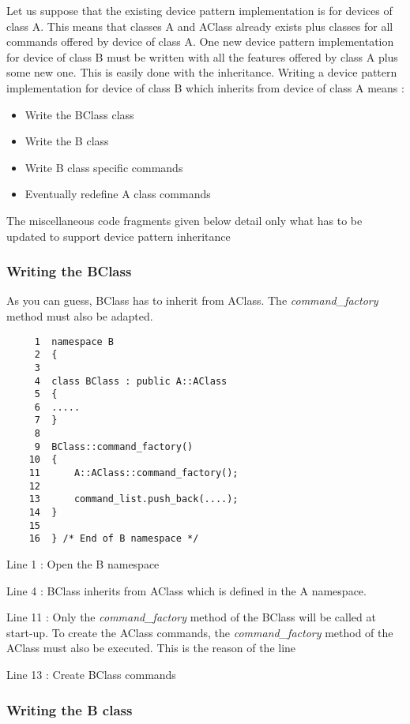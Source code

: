 Let us suppose that the existing device pattern implementation is
for devices of class A. This means that classes A and AClass already
exists plus classes for all commands offered by device of class A.
One new device pattern implementation for device of
class B must be written with all the features offered by class A plus
some new one. This is easily done with the inheritance. Writing a
device pattern implementation for device of class B which inherits
from device of class A means :
\begin{itemize}
\item Write the BClass class
\item Write the B class
\item Write B class specific commands
\item Eventually redefine A class commands
\end{itemize}
The miscellaneous code fragments given below detail only what has
to be updated to support device pattern inheritance


\subsubsection{Writing the BClass}

As you can guess, BClass has to inherit from AClass. The \emph{command\_factory}
method must also be adapted.


\begin{verbatim}
     1  namespace B
     2  {
     3  
     4  class BClass : public A::AClass
     5  {
     6  .....
     7  }
     8  
     9  BClass::command_factory()
    10  {
    11      A::AClass::command_factory();
    12  
    13      command_list.push_back(....);
    14  }
    15  
    16  } /* End of B namespace */
\end{verbatim}


Line 1 : Open the B namespace

Line 4 : BClass inherits from AClass which is defined in the A namespace.

Line 11 : Only the \emph{command\_factory} method of the BClass will
be called at start-up. To create the AClass commands, the \emph{command\_factory}
method of the AClass must also be executed. This is the reason of
the line

Line 13 : Create BClass commands


\subsubsection{Writing the B class}

